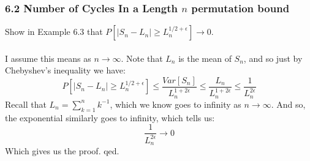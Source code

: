 \documentclass[12pt,a4paper]{article}
\newcommand{\1}[1]{\mathbbm{1}\left\{ #1 \right\}}
\begin{document}
\subsubsection{6.2 Number of Cycles In a Length $n$ permutation bound} Show in Example 6.3 that $P\left[|S_n - L_n| \geq L_n^{1/2 + \epsilon}\right] \to 0$.
\\\\
I assume this means as $n \to \infty$. Note that $L_n$ is the mean of $S_n$, and so just by Chebyshev's inequality we have:
$$
	P\left[|S_n - L_n| \geq L_n^{1/2 + \epsilon}\right] \leq \frac{Var[S_n]}{L_n^{1 + 2\epsilon}} \leq \frac{L_n}{L_n^{1+2\epsilon}} \leq \frac{1}{L_n^{2\epsilon}}
$$
Recall that $L_n = \sum_{k=1}^n k^{-1}$, which we know goes to infinity as $n \to \infty$. And so, the exponential similarly goes to infinity, which tells us:
$$
	\frac{1}{L_n^{2\epsilon}} \to 0
$$
Which gives us the proof. qed.
\end{document}
